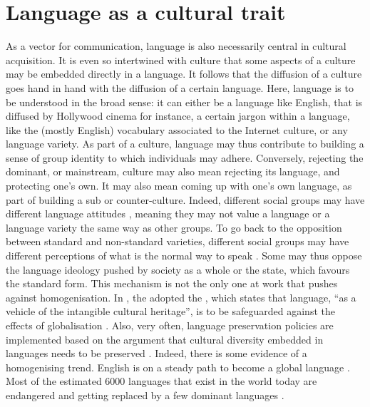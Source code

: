\documentclass[../thesis.tex]{subfiles}
\begin{document}
\section{Language as a cultural trait}
As a vector for communication, language is also necessarily central in cultural
acquisition. It is even so intertwined with culture that some aspects of a culture may
be embedded directly in a language. It follows that the diffusion of a culture goes hand
in hand with the diffusion of a certain language. Here, language is to be understood in
the broad sense: it can either be a language like English, that is diffused by Hollywood
cinema for instance, a certain jargon within a language, like the (mostly English)
vocabulary associated to the Internet culture, or any language variety. As part of a
culture, language may thus contribute to building a sense of group identity to which
individuals may adhere. Conversely, rejecting the dominant, or mainstream, culture may
also mean rejecting its language, and protecting one's own. It may also mean coming up
with one's own language, as part of building a sub or counter-culture. Indeed, different
social groups may have different language attitudes \cite{GarrettLanguageAttitudes2006},
meaning they may not value a language or a language variety the same way as other
groups. To go back to the opposition between standard and non-standard varieties,
different social groups may have different perceptions of what is the normal way to
speak \cite{KretzschmarLanguageVariation2010}. Some may thus oppose the language
ideology pushed by society as a whole or the state, which favours the standard form.
This mechanism
is not the only one at work that pushes against homogenisation. In
\citeyear{UNESCOConventionSafeguarding2003}, the
\citeauthor{UNESCOConventionSafeguarding2003} adopted the
, which states that language, ``as a vehicle
of the intangible cultural heritage'', is to be safeguarded against the effects of
globalisation \cite{UNESCOConventionSafeguarding2003}. Also, very often, language
preservation policies are implemented based on the argument that cultural diversity
embedded in languages needs to be preserved
\cite{CrystalLanguageDeath2000,GrenobleEndangeredLanguages1998,KraussWorldLanguages1992}.
Indeed, there is some evidence of a homogenising trend. English is on a steady path to
become a global language \cite{CrystalEnglishGlobal2010}. Most of the estimated
\SI{6000}{} languages that exist in the world today are endangered
\cite{CrystalLanguageDeath2000,GrenobleEndangeredLanguages1998,KraussWorldLanguages1992}
and getting replaced by a few dominant languages
\cite{GrilloDominantLanguages1989,WardhaughLanguagesCompetition1987}.
\end{document}
